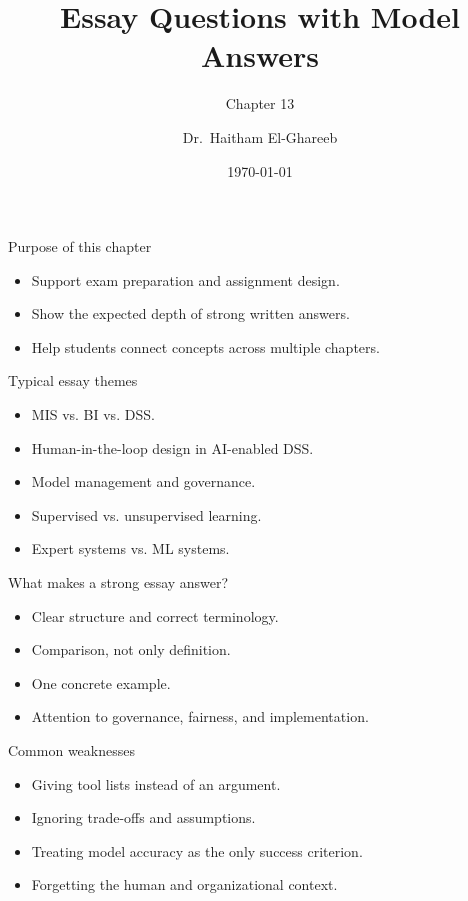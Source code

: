 \documentclass[aspectratio=169,11pt]{beamer}
\title[Essay Revision]{Essay Questions with Model Answers}
\subtitle{Chapter 13}
\author{Dr.\ Haitham El-Ghareeb}
\institute{Faculty of Computers and Information Sciences}
\date{\today}
\begin{document}
\begin{frame}
  \titlepage
\end{frame}

\begin{frame}{Purpose of this chapter}
  \begin{itemize}
    \item Support exam preparation and assignment design.
    \item Show the expected depth of strong written answers.
    \item Help students connect concepts across multiple chapters.
  \end{itemize}
\end{frame}

\begin{frame}{Typical essay themes}
  \begin{itemize}
    \item MIS vs. BI vs. DSS.
    \item Human-in-the-loop design in AI-enabled DSS.
    \item Model management and governance.
    \item Supervised vs. unsupervised learning.
    \item Expert systems vs. ML systems.
  \end{itemize}
\end{frame}

\begin{frame}{What makes a strong essay answer?}
  \begin{itemize}
    \item Clear structure and correct terminology.
    \item Comparison, not only definition.
    \item One concrete example.
    \item Attention to governance, fairness, and implementation.
  \end{itemize}
\end{frame}

\begin{frame}{Common weaknesses}
  \begin{itemize}
    \item Giving tool lists instead of an argument.
    \item Ignoring trade-offs and assumptions.
    \item Treating model accuracy as the only success criterion.
    \item Forgetting the human and organizational context.
  \end{itemize}
\end{frame}
\end{document}
